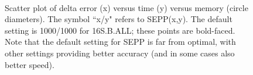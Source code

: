 \begin{figure}[htbp]
  \centering
\\
  \caption{Scatter plot of delta error (x) versus time (y) versus memory
(circle diameters). The symbol ``x/y" refers to SEPP(x,y). The default
setting is 1000/1000 for 16S.B.ALL; these points
are bold-faced. Note that the default setting for SEPP is
far from optimal, with other settings providing
better accuracy (and in some cases also better speed).} 
  \label{fig:design-bio}
\end{figure}

